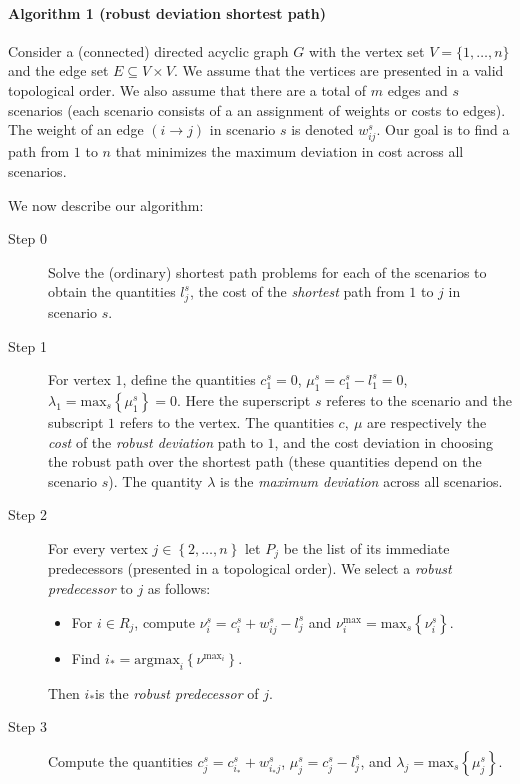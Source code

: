 %

\paragraph{Algorithm 1 (robust deviation shortest path)}

Consider a (connected) directed acyclic graph $G$ with the vertex set $V = \{1, \dots, n\}$ and the edge set $E \subseteq V \times V$. We assume that the vertices are presented in a valid topological order. We also assume that there are a total of $m$ edges and $s$ scenarios (each scenario consists of a an assignment of weights or costs to edges). The weight of an edge $(i \rightarrow j)$ in scenario $s$ is denoted $w^s_{ij}$. Our goal is to find a path from $1$ to $n$ that minimizes the maximum deviation in cost across all scenarios.\cite{some_refs}

We now describe our algorithm:

\begin{description}
\item[Step 0] Solve the (ordinary) shortest path problems for each of the scenarios to obtain the quantities $l^s_j$, the cost of the \emph{shortest} path from $1$ to $j$ in scenario $s$.
\item[Step 1] For vertex $1$, define the quantities $c^s_1 = 0$, $\mu^s_1 = c^s_1 - l^s_1 = 0$, $\lambda_1 = \textrm{max}_s\left\{\mu^s_1\right\} = 0$. Here the superscript $s$ referes to the scenario and the subscript $1$ refers to the vertex. The quantities $c, ~\mu$ are respectively the \textit{cost} of the \emph{robust deviation} path to $1$,  and the cost deviation in choosing the robust path over the shortest path (these quantities depend on the scenario $s$). The quantity $\lambda$ is the \emph{maximum deviation} across all scenarios. 
\item[Step 2] For every vertex $j \in \left\{2,\dots, n\right\}$ let $P_j$ be the list of its immediate predecessors (presented in a topological order). We select a \emph{robust predecessor} to $j$ as follows:
	\begin{itemize}
		\item For $i \in R_j$, compute $\nu^s_i = c^s_i + w^s_{ij} - l^s_j$ and $\nu^{\textrm{max}}_i = \textrm{max}_s\left\{\nu^s_i\right\}$.
		\item Find $i_* = \textrm{argmax}_i\left\{\nu^{\textrm{max}_i}\right\}$.
	\end{itemize}
	Then $i_*$is the \emph{robust predecessor} of $j$.
\item[Step 3] Compute the quantities $c^s_j = c^s_{i_*} + w^s_{i_*j}$, $\mu^s_j = c^s_j - l^s_j$, and $\lambda_j = \textrm{max}_s\left\{\mu^s_j\right\}$.
\end{description}

